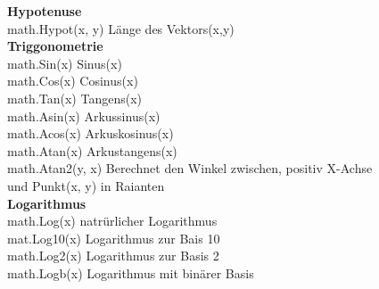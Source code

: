 \documentclass[twoside,a4paper,12pt]{article}
\begin{document}
\begin{tabbing}
 \> \textbf{Hypotenuse} \\ 
 \> math.Hypot(x, y)\> Länge des Vektors(x,y) \\ 
 \> \textbf{Triggonometrie} \\ 
 \> math.Sin(x)\> Sinus(x) \\ 
 \> math.Cos(x)\> Cosinus(x) \\ 
 \> math.Tan(x)\> Tangens(x) \\
 \> math.Asin(x)\> Arkussinus(x) \\ 
 \> math.Acos(x)\> Arkuskosinus(x) \\ 
 \> math.Atan(x)\> Arkustangens(x) \\
 \> math.Atan2(y, x)\> Berechnet den Winkel zwischen, positiv X-Achse \\ 
 \> \> und Punkt(x, y) in Raianten \\
 \> \textbf{Logarithmus} \\ 
 \> math.Log(x)\> natrürlicher Logarithmus \\
 \> mat.Log10(x)\> Logarithmus zur Bais 10 \\ 
 \> math.Log2(x)\> Logarithmus zur Basis 2 \\ 
 \> math.Logb(x)\> Logarithmus mit binärer Basis \\ 
\end{tabbing}
\end{document}
